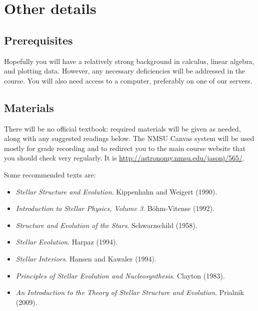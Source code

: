 \documentclass[10pt,letterpaper]{article}
\begin{document}
\section{Other details}

\subsection*{Prerequisites}

Hopefully you will have a relatively strong background in calculus,  linear algebra, and plotting data.  However, any necessary deficiencies will be addressed in the course.  You will also need access to a computer, preferably on one of our servers.

\subsection*{Materials}




There will be no official textbook: required materials will be given as needed, along with any suggested readings below. The NMSU Canvas system will be used  mostly for grade recording and to redirect you to the main course website that you should check very regularly. It is \href{http://astronomy.nmsu.edu/jasonj/565/}{http://astronomy.nmsu.edu/jasonj/565/}.

 Some recommended texts are:
 \begin{itemize}\itemsep 0cm
 \item \textit{Stellar Structure and Evolution}. Kippenhahn and Weigert (1990).
 \item \textit{Introduction to Stellar Physics, Volume 3}. B\"{o}hm-Vitense (1992).
 \item \textit{Structure and Evolution of the Stars}. Schwarzschild (1958).
 \item \textit{Stellar Evolution}. Harpaz (1994).
 \item \textit{Stellar Interiors}. Hansen and Kawaler (1994).
 \item \textit{Principles of Stellar Evolution and Nucleosynthesis}. Clayton (1983).
 \item \textit{An Introduction to the Theory of Stellar Structure and Evolution}. Prialnik (2009).
 \end{itemize}
\end{document}
